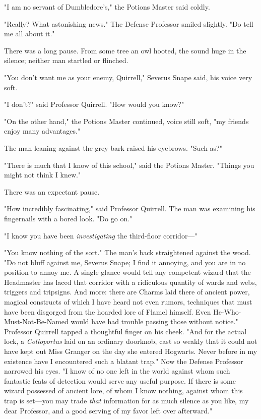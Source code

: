 "I am no servant of Dumbledore's," the Potions Master said coldly.

"Really? What astonishing news." The Defense Professor smiled slightly. "Do
tell me all about it."

There was a long pause. From some tree an owl hooted, the sound huge in the
silence; neither man startled or flinched.

"You don't want me as your enemy, Quirrell," Severus Snape said, his voice very
soft.

"I don't?" said Professor Quirrell. "How would you know?"

"On the other hand," the Potions Master continued, voice still soft, "my
friends enjoy many advantages."

The man leaning against the grey bark raised his eyebrows. "Such as?"

"There is much that I know of this school," said the Potions Master. "Things
you might not think I knew."

There was an expectant pause.

"How incredibly fascinating," said Professor Quirrell. The man was examining
his fingernails with a bored look. "Do go on."

"I know you have been{\el} \emph{investigating{\el}} the third-floor
corridor---"

"You know nothing of the sort." The man's back straightened against the wood.
"Do not bluff against me, Severus Snape; I find it annoying, and you are in no
position to annoy me. A single glance would tell any competent wizard that the
Headmaster has laced that corridor with a ridiculous quantity of wards and
webs, triggers and tripsigns. And more: there are Charms laid there of ancient
power, magical constructs of which I have heard not even rumors, techniques
that must have been disgorged from the hoarded lore of Flamel himself. Even
He-Who-Must-Not-Be-Named would have had trouble passing those without notice."
Professor Quirrell tapped a thoughtful finger on his cheek. "And for the actual
lock, a \emph{Colloportus} laid on an ordinary doorknob, cast so weakly that it
could not have kept out Miss Granger on the day she entered Hogwarts. Never
before in my existence have I encountered such a blatant trap." Now the Defense
Professor narrowed his eyes. "I know of no one left in the world against whom
such fantastic feats of detection would serve any useful purpose. If there is
some wizard possessed of ancient lore, of whom I know nothing, against whom
this trap is set---you may trade \emph{that} information for as much silence as
you like, my dear Professor, and a good serving of my favor left over
afterward."

